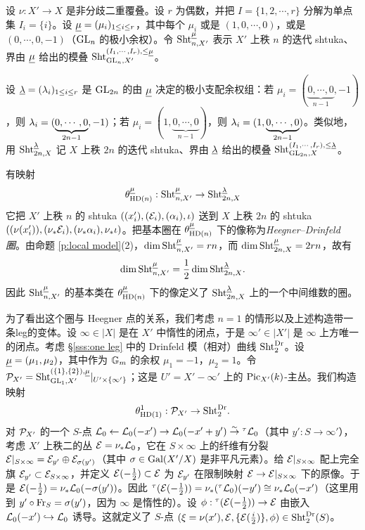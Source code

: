 \begin{exam}\label{ex:HD}
设 $\nu: X'\to X$ 是非分歧二重覆叠。设 $r$ 为偶数，并把 $I=\{1,2,\cdots, r\}$ 分解为单点集 $I_{i}=\{i\}$。设 $\underline\mu=(\mu_{i})_{1\le i\le r}$，其中每个 $\mu_{i}$ 或是 $(1,0,\cdots,0)$，或是 $(0,\cdots, 0,-1)$（$\textup{GL}_{n}$ 的极小余权）。令 $\textup{Sht}^{\underline\mu}_{n,X'}$ 表示 $X'$ 上秩 $n$ 的迭代 shtuka、界由 $\underline\mu$ 给出的模叠 $\textup{Sht}^{(I_{1},\cdots, I_{r}),\le\underline\mu}_{\textup{GL}_{n},X'}$。

设 $\underline{\lambda}=(\lambda_{i})_{1\le i\le r}$ 是 $\textup{GL}_{2n}$ 的由 $\underline\mu$ 决定的极小支配余权组：若 $\mu_{i}=(\underbrace{0,\cdots, 0}_{n-1},-1)$，则 $\lambda_{i}=(\underbrace{0,\cdots,0}_{2n-1}, -1)$；若 $\mu_{i}=(1,\underbrace{0,\cdots,0}_{n-1})$，则 $\lambda_{i}=(1, \underbrace{0,\cdots,0}_{2n-1})$。类似地，用 $\textup{Sht}^{\underline{\lambda}}_{2n,X}$ 记 $X$ 上秩 $2n$ 的迭代 shtuka、界由 $\underline{\lambda}$ 给出的模叠 $\textup{Sht}^{(I_{1},\cdots, I_{r}),\le\underline{\lambda}}_{\textup{GL}_{2n},X}$。

有映射
\begin{equation*}
\theta^{\underline\mu}_{\textup{HD}(n)}: \textup{Sht}^{\underline\mu}_{n, X'}\to \textup{Sht}^{\underline{\lambda}}_{2n,X}
\end{equation*}
它把 $X'$ 上秩 $n$ 的 shtuka $((x'_{i}), (\mathcal{E}_{i}), (\alpha_{i}), \iota)$ 送到 $X$ 上秩 $2n$ 的 shtuka $((\nu(x'_{i})), (\nu_{*}\mathcal{E}_{i}),(\nu_{*}\alpha_{i}), \nu_{*}\iota)$。把基本圈在 $\theta^{\underline\mu}_{\textup{HD}(n)}$ 下的像称为\emph{Heegner–Drinfeld 圈}。由命题 \ref{p:local model}(2)，$\dim \textup{Sht}^{\underline\mu}_{n,X'}=rn$，而 $\dim \textup{Sht}^{\underline\mu}_{2n,X}=2rn$，故有
\begin{equation*}
\dim  \textup{Sht}^{\underline\mu}_{n,X'}=\frac{1}{2}\dim \textup{Sht}^{\underline{\lambda}}_{2n,X}.
\end{equation*}
因此 $\textup{Sht}^{\underline\mu}_{n,X'}$ 的基本类在 $\theta^{\underline\mu}_{\textup{HD}(n)}$ 下的像定义了 $\textup{Sht}^{\underline{\lambda}}_{2n,X}$ 上的一个中间维数的圈。

为了看出这个圈与 Heegner 点的关系，我们考虑 $n=1$ 的情形以及上述构造带一条leg的变体。设 $\infty\in |X|$ 是在 $X'$ 中惰性的闭点，于是 $\infty'\in |X'|$ 是 $\infty$ 上方唯一的闭点。考虑 \S\ref{sss:one leg} 中的 Drinfeld 模（相对）曲线 $\textup{Sht}^{\mathrm{Dr}}_{2}$。设 $\underline\mu=(\mu_{1},\mu_{2})$，其中作为 $\mathbb{G}_m$ 的余权 $\mu_{1}=-1$，$\mu_{2}=1$。令 $\mathcal{P}_{X'}=\textup{Sht}^{(\{1\},\{2\}), \underline\mu}_{\textup{GL}_{1}, X'}|_{U'\times \{\infty'\}}$；这是 $U'=X'-\infty'$ 上的 $\textup{Pic}_{X'}(k)$-主丛。我们构造映射
\begin{equation*}
\theta^{1}_{\textup{HD}(1)}: \mathcal{P}_{X'}\to \textup{Sht}^{\mathrm{Dr}}_{2}.
\end{equation*}
对 $\mathcal{P}_{X'}$ 的一个 $S$-点 $\mathcal{L}_{0}\leftarrow\mathcal{L}_{0}(-x')\rightarrow\mathcal{L}_{0}(-x'+y')\stackrel{\sim}{\to} {}^{\tau}\mathcal{L}_{0}$（其中 $y':S\to \infty'$），考虑 $X'$ 上秩二的丛 $\mathcal{E}=\nu_{*}\mathcal{L}_{0}$，它在 $S\times\infty$ 上的纤维有分裂 $\mathcal{E}|_{S\times\infty}=\mathcal{E}_{y'}\oplus \mathcal{E}_{\sigma(y')}$（其中 $\sigma\in \textup{Gal}(X'/X)$ 是非平凡元素）。给 $\mathcal{E}|_{S\times \infty}$ 配上完全旗 $\mathcal{E}_{y'}\subset \mathcal{E}_{S\times\infty}$，并定义 $\mathcal{E}(-\frac{1}{2})\subset \mathcal{E}$ 为 $\mathcal{E}_{y'}$ 在限制映射 $\mathcal{E}\to \mathcal{E}|_{S\times \infty}$ 下的原像。于是 $\mathcal{E}(-\frac{1}{2})=\nu_{*}\mathcal{L}_{0}(-\sigma(y'))$。因此 ${}^{\tau}(\mathcal{E}(-\frac{1}{2}))=\nu_{*}({}^{\tau}\mathcal{L}_{0})(-y')\cong \nu_{*}\mathcal{L}_{0}(-x')$（这里用到 $y'\circ\textup{Fr}_{S}=\sigma(y')$，因为 $\infty$ 是惰性的）。设 $\phi: {}^{\tau}(\mathcal{E}(-\frac{1}{2}))\to \mathcal{E}$ 由嵌入 $\mathcal{L}_{0}(-x')\hookrightarrow \mathcal{L}_{0}$ 诱导。这就定义了 $S$-点 $(\xi=\nu(x'), \mathcal{E}, \{\mathcal{E}(\frac{i}{2})\}, \phi)\in \textup{Sht}^{\mathrm{Dr}}_{2}(S)$。


\end{exam}
